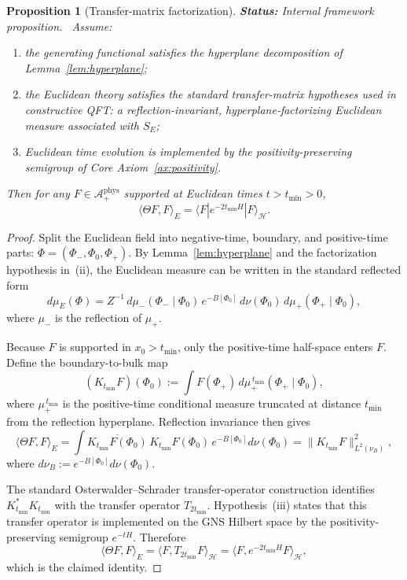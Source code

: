 \documentclass[12pt,a4paper]{article}
\theoremstyle{plain}
\newtheorem{proposition}[theorem]{Proposition}
\theoremstyle{definition}
\theoremstyle{remark}
\newcommand{\hilb}{\mathcal{H}}
\newcommand{\alg}{\mathcal{A}}
\newcommand{\status}[1]{\textnormal{\textbf{Status:} #1.}\ }
\begin{document}
\begin{proposition}[Transfer-matrix factorization]\label{prop:transfer}
  \status{Internal framework proposition}
  Assume:
  \begin{enumerate}[nosep,label=(\roman*)]
  \item the generating functional satisfies the hyperplane
    decomposition of Lemma~\ref{lem:hyperplane};
  \item the Euclidean theory satisfies the standard transfer-matrix
    hypotheses used in constructive QFT: a reflection-invariant,
    hyperplane-factorizing Euclidean measure associated with $S_E$;
  \item Euclidean time evolution is implemented by the
    positivity-preserving semigroup of Core Axiom~\ref{ax:positivity}.
  \end{enumerate}
  Then for any $F \in \alg^{\mathrm{phys}}_+$ supported at Euclidean
  times $t > t_{\min} > 0$,
  \begin{equation}
    \langle \Theta F, F \rangle_E
    = \langle F | e^{-2t_{\min}H} | F\rangle_\hilb.
  \end{equation}
\end{proposition}
\begin{proof}
  Split the Euclidean field into negative-time, boundary, and
  positive-time parts:
  $\Phi = (\Phi_-, \Phi_0, \Phi_+)$. By
  Lemma~\ref{lem:hyperplane} and the factorization hypothesis in~(ii),
  the Euclidean measure can be written in the standard reflected form
  \[
    d\mu_E(\Phi)
    = Z^{-1} \,
      d\mu_-(\Phi_- \mid \Phi_0)\,
      e^{-B[\Phi_0]}\, d\nu(\Phi_0)\,
      d\mu_+(\Phi_+ \mid \Phi_0),
  \]
  where $\mu_-$ is the reflection of $\mu_+$.

  Because $F$ is supported in $x_0 > t_{\min}$, only the positive-time
  half-space enters $F$. Define the boundary-to-bulk map
  \[
    (K_{t_{\min}}F)(\Phi_0)
    := \int F(\Phi_+)\, d\mu_+^{\,t_{\min}}(\Phi_+ \mid \Phi_0),
  \]
  where $\mu_+^{\,t_{\min}}$ is the positive-time conditional measure
  truncated at distance $t_{\min}$ from the reflection hyperplane.
  Reflection invariance then gives
  \[
    \langle \Theta F, F\rangle_E
    = \int \overline{K_{t_{\min}}F(\Phi_0)}\,
      K_{t_{\min}}F(\Phi_0)\,
      e^{-B[\Phi_0]} d\nu(\Phi_0)
    = \|K_{t_{\min}}F\|_{L^2(\nu_B)}^2,
  \]
  where $d\nu_B := e^{-B[\Phi_0]} d\nu(\Phi_0)$.

  The standard Osterwalder--Schrader transfer-operator construction
  identifies $K_{t_{\min}}^*K_{t_{\min}}$ with the transfer operator
  $T_{2t_{\min}}$. Hypothesis~(iii) states that this transfer operator
  is implemented on the GNS Hilbert space by the positivity-preserving
  semigroup $e^{-tH}$. Therefore
  \[
    \langle \Theta F, F\rangle_E
    = \langle F, T_{2t_{\min}}F\rangle_\hilb
    = \langle F, e^{-2t_{\min}H}F\rangle_\hilb,
  \]
  which is the claimed identity.
\end{proof}
\end{document}

